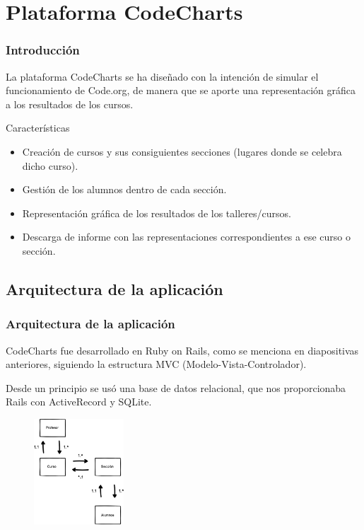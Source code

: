 \documentclass{beamer}
\begin{document}

\section{Plataforma CodeCharts}

\begin{frame}
\frametitle{Introducción}

La plataforma CodeCharts se ha diseñado con la intención de simular el funcionamiento de Code.org, de manera que se aporte una representación gráfica a los resultados
de los cursos.

\begin{block}{Características}
    \begin{itemize}
        \item Creación de cursos y sus consiguientes secciones (lugares donde se celebra dicho curso).
        \item Gestión de los alumnos dentro de cada sección.
        \item Representación gráfica de los resultados de los talleres/cursos.
        \item Descarga de informe con las representaciones correspondientes a ese curso o sección.
    \end{itemize}
\end{block}

\end{frame}

\subsection{Arquitectura de la aplicación}

\begin{frame}
\frametitle{Arquitectura de la aplicación}

CodeCharts fue desarrollado en Ruby on Rails, como se menciona en diapositivas anteriores, siguiendo la estructura MVC (Modelo-Vista-Controlador). 

Desde un principio se usó una base de datos relacional, que nos proporcionaba Rails con ActiveRecord y SQLite.

\begin{figure}
    \includegraphics[width=0.3\textwidth]{img/base_de_datos.eps}
\end{figure}

\end{frame}
\end{document}
